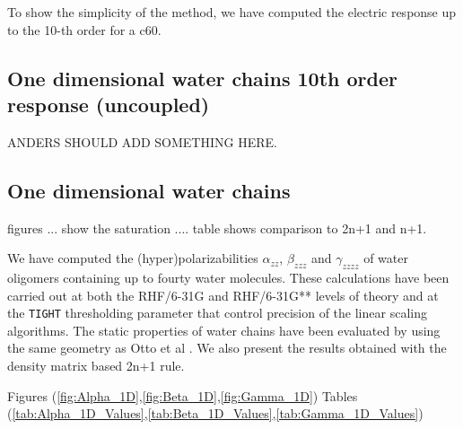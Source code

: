 \documentclass[prl,aps,twocolumn,showpacs,twocolumngrid,superbib]{revtex4}
\begin{document}
To show the simplicity of the method, we have computed the electric response up to the 10-th order
for a c60.



\subsection{One dimensional water chains 10th order response (uncoupled)}
ANDERS SHOULD ADD SOMETHING HERE.

\subsection{One dimensional water chains}
figures ... show the saturation ....
table shows comparison to 2n+1 and n+1.

We have computed the (hyper)polarizabilities $\alpha_{zz}$, 
$\beta_{zzz}$ and $\gamma_{zzzz}$ of water oligomers containing
up to fourty water molecules. These calculations have been carried out at
both the RHF/6-31G and RHF/6-31G** levels of
theory and at the {\tt TIGHT} thresholding parameter 
that control precision of the linear scaling algorithms.
The static properties of water chains have been evaluated
by using the same geometry as Otto et al \cite{POtto00}. We also
present the results obtained with the density matrix based 2n+1 rule.


Figures (\ref{fig:Alpha_1D},\ref{fig:Beta_1D},\ref{fig:Gamma_1D})
Tables (\ref{tab:Alpha_1D_Values},\ref{tab:Beta_1D_Values},\ref{tab:Gamma_1D_Values})
\end{document}
